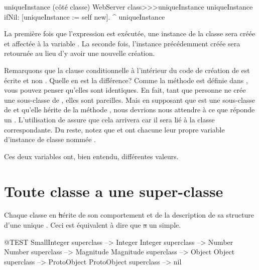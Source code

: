 \documentclass[a4paper,10pt,twoside]{book}
\begin{document}
\begin{method}[uniqueInstance]{uniqueInstance (côté classe)}
WebServer class>>>uniqueInstance
     uniqueInstance ifNil: [uniqueInstance := self new].
     ^ uniqueInstance
\end{method}

La première fois que l'expression  est exécutée, une instance de la classe  sera créée et affectée à la variable . 
La seconde fois, l'instance précédemment créée sera retournée au lieu d'y avoir une nouvelle création. 

Remarquons que la clause conditionnelle à l'intérieur du code de création
de  est écrite  et non 
\mbox{.}
Quelle en est la différence?   Comme la méthode  est définie dans , vous pouvez penser qu'elles sont identiques.    En fait, tant que personne ne crée une sous-classe de , elles sont pareilles. Mais en supposant que  est une sous-classe de  et qu'elle hérite de la méthode ,
nous devrions nous attendre à ce que  réponde un . L'utilisation de \self assure que cela arrivera car il sera lié à la classe correspondante.
Du reste, notez que  et  ont chacune
leur propre variable d'instance de classe nommée .  

Ces deux variables ont, bien entendu, différentes valeurs.

\section{Toute classe a une super-classe}


Chaque classe en \st hérite de son comportement et de la description
de sa structure d'une unique .
Ceci est équivalent à dire que \st a un  simple.

\begin{code}{@TEST}
SmallInteger superclass --> Integer
Integer superclass          --> Number
Number superclass        --> Magnitude
Magnitude superclass    --> Object
Object superclass           --> ProtoObject
ProtoObject superclass  --> nil
\end{code}
\end{document}

